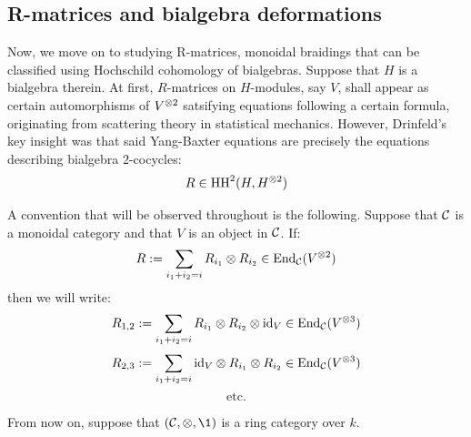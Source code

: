     \subsection{R-matrices and bialgebra deformations}
        Now, we move on to studying R-matrices, monoidal braidings that can be classified using Hochschild cohomology of bialgebras. Suppose that $H$ is a bialgebra therein. At first, $R$-matrices on $H$-modules, say $V$, shall appear as certain automorphisms of $V^{\tensor 2}$ satsifying equations following a certain  formula, originating from scattering theory in statistical mechanics. However, Drinfeld's key insight was that said Yang-Baxter equations are precisely the equations describing bialgebra $2$-cocycles:
            $$R \in \HH^2(H, H^{\tensor 2})$$
        
    
        \begin{convention}
            A convention that will be observed throughout is the following. Suppose that $\mathcal{C}$ is a monoidal category and that $V$ is an object in $\mathcal{C}$. If:
                $$R := \sum_{i_1 + i_2 = i} R_{i_1} \tensor R_{i_2} \in \End_{\C}(V^{\tensor 2})$$
            then we will write:
                $$R_{1, 2} := \sum_{i_1 + i_2 = i} R_{i_1} \tensor R_{i_2} \tensor \id_V \in \End_{\C}(V^{\tensor 3})$$
                $$R_{2, 3} := \sum_{i_1 + i_2 = i} \id_V \tensor R_{i_1} \tensor R_{i_2} \in \End_{\C}(V^{\tensor 3})$$
                $$\text{etc.}$$
        \end{convention}

        \begin{convention}
            From now on, suppose that $(\C, \tensor, \1)$ is a ring category over $k$.
        \end{convention}
    
